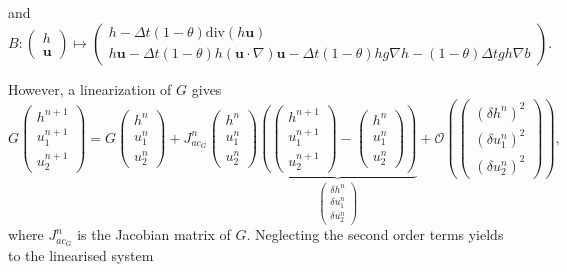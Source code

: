 \documentclass[a4paper, 11pt]{report}
\begin{document}
and
\begin{equation*}
B:
\begin{pmatrix}
h\\\boldsymbol{u}
\end{pmatrix}\mapsto\begin{pmatrix}h-\Delta t(1-\theta)\text{div}(h\boldsymbol{u})\\
h\boldsymbol{u}-\Delta t(1-\theta)h\left(\boldsymbol{u}\cdot \nabla\right)\boldsymbol{u}-\Delta t(1-\theta)hg\nabla h-(1-\theta)\Delta tgh\nabla b
\end{pmatrix}.
\end{equation*}


However, 
a linearization of $G$ gives
\begin{equation*}
G\begin{pmatrix}h^{n+1}\\u_1^{n+1}\\u_2^{n+1}\end{pmatrix}=G\begin{pmatrix}h^{n}\\u_1^{n}\\u_2^{n}\end{pmatrix}+J_{ac_G}^n\begin{pmatrix}h^n\\u_1^n\\u_2^n\end{pmatrix}\underbrace{\left(\begin{pmatrix}h^{n+1}\\u_1^{n+1}\\u_2^{n+1}\end{pmatrix}-\begin{pmatrix}h^n\\u_1^n\\u_2^n\end{pmatrix}\right)}_{\begin{pmatrix}\delta h^n\\\delta u_1^n\\\delta u_2^n\end{pmatrix}}+\mathcal{O}\left(\begin{pmatrix}(\delta h^n)^2\\(\delta u_1^n)^2\\(\delta u_2^n)^2\end{pmatrix}\right),
\end{equation*}
where $J_{ac_G}^n$ is the Jacobian matrix of $G$.
Neglecting the second order terms yields to the linearised system
\end{document}
